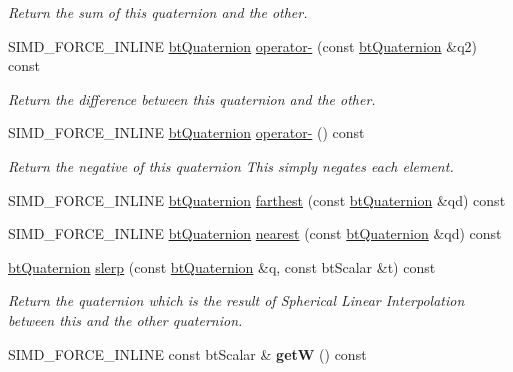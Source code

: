 \begin{DoxyCompactItemize}
\begin{DoxyCompactList}\small\item\em Return the sum of this quaternion and the other. \end{DoxyCompactList}\item 
S\+I\+M\+D\+\_\+\+F\+O\+R\+C\+E\+\_\+\+I\+N\+L\+I\+NE \hyperlink{classbtQuaternion}{bt\+Quaternion} \hyperlink{classbtQuaternion_a2b440e462111b777fd2229446ba4618c}{operator-\/} (const \hyperlink{classbtQuaternion}{bt\+Quaternion} \&q2) const
\begin{DoxyCompactList}\small\item\em Return the difference between this quaternion and the other. \end{DoxyCompactList}\item 
\mbox{\label{classbtQuaternion_af3e8f7a6be3e581a2cead40723cf873c}} 
S\+I\+M\+D\+\_\+\+F\+O\+R\+C\+E\+\_\+\+I\+N\+L\+I\+NE \hyperlink{classbtQuaternion}{bt\+Quaternion} \hyperlink{classbtQuaternion_af3e8f7a6be3e581a2cead40723cf873c}{operator-\/} () const
\begin{DoxyCompactList}\small\item\em Return the negative of this quaternion This simply negates each element. \end{DoxyCompactList}\item 
S\+I\+M\+D\+\_\+\+F\+O\+R\+C\+E\+\_\+\+I\+N\+L\+I\+NE \hyperlink{classbtQuaternion}{bt\+Quaternion} \hyperlink{classbtQuaternion_a4c5ce0652f1cff12d1981c49b43483f1}{farthest} (const \hyperlink{classbtQuaternion}{bt\+Quaternion} \&qd) const
\item 
S\+I\+M\+D\+\_\+\+F\+O\+R\+C\+E\+\_\+\+I\+N\+L\+I\+NE \hyperlink{classbtQuaternion}{bt\+Quaternion} \hyperlink{classbtQuaternion_aba0984f947a7ad85a023e2b24ffc4db1}{nearest} (const \hyperlink{classbtQuaternion}{bt\+Quaternion} \&qd) const
\item 
\hyperlink{classbtQuaternion}{bt\+Quaternion} \hyperlink{classbtQuaternion_a0b34cbf669afb05d0618ff100a76b0dc}{slerp} (const \hyperlink{classbtQuaternion}{bt\+Quaternion} \&q, const bt\+Scalar \&t) const
\begin{DoxyCompactList}\small\item\em Return the quaternion which is the result of Spherical Linear Interpolation between this and the other quaternion. \end{DoxyCompactList}\item 
\mbox{\label{classbtQuaternion_a3d072cde7db77cb3a100f99999950297}} 
S\+I\+M\+D\+\_\+\+F\+O\+R\+C\+E\+\_\+\+I\+N\+L\+I\+NE const bt\+Scalar \& {\bfseries getW} () const
\end{DoxyCompactItemize}
